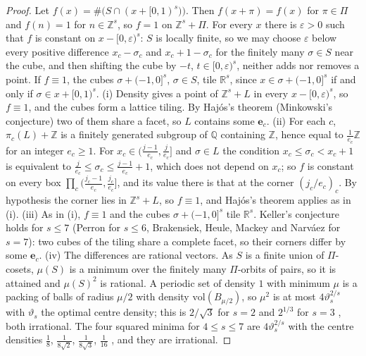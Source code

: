 \documentclass[11pt]{amsart}
\theoremstyle{definition}
\theoremstyle{plain}
\newcommand{\Z}{\mathbb{Z}}
\newcommand{\e}{\mathbf{e}}
\providecommand{\R}{\mathbb{R}}
\begin{document}
\begin{proof}
Let $f(x)=\#\bigl(S\cap(x+[0,1)^s)\bigr)$. Then $f(x+\pi)=f(x)$ for $\pi\in\Pi$ and $f(n)=1$ for $n\in\Z^s$, so $f=1$ on $\Z^s+\Pi$. For every $x$ there is $\varepsilon>0$ such that $f$ is constant on $x-[0,\varepsilon)^s$: $S$ is locally finite, so we may choose $\varepsilon$ below every positive difference $x_c-\sigma_c$ and $x_c+1-\sigma_c$ for the finitely many $\sigma\in S$ near the cube, and then shifting the cube by $-t$, $t\in[0,\varepsilon)^s$, neither adds nor removes a point. If $f\equiv1$, the cubes $\sigma+(-1,0]^s$, $\sigma\in S$, tile $\R^s$, since $x\in\sigma+(-1,0]^s$ if and only if $\sigma\in x+[0,1)^s$.
(i) Density gives a point of $\Z^s+L$ in every $x-[0,\varepsilon)^s$, so $f\equiv1$, and the cubes form a lattice tiling. By Haj\'os's theorem (Minkowski's conjecture) \cite{Haj42} two of them share a facet, so $L$ contains some $\e_c$.
(ii) For each $c$, $\pi_c(L)+\Z$ is a finitely generated subgroup of $\mathbb Q$ containing $\Z$, hence equal to $\frac1{e_c}\Z$ for an integer $e_c\ge1$. For $x_c\in(\frac{j-1}{e_c},\frac j{e_c}]$ and $\sigma\in L$ the condition $x_c\le\sigma_c<x_c+1$ is equivalent to $\frac j{e_c}\le\sigma_c\le\frac{j-1}{e_c}+1$, which does not depend on $x_c$; so $f$ is constant on every box $\prod_c(\frac{j_c-1}{e_c},\frac{j_c}{e_c}]$, and its value there is that at the corner $(j_c/e_c)_c$. By hypothesis the corner lies in $\Z^s+L$, so $f\equiv1$, and Haj\'os's theorem applies as in (i).
(iii) As in (i), $f\equiv1$ and the cubes $\sigma+(-1,0]^s$ tile $\R^s$. Keller's conjecture holds for $s\le7$ (Perron \cite{Per40} for $s\le6$, Brakensiek, Heule, Mackey and Narv\'aez \cite{BHMN20} for $s=7$): two cubes of the tiling share a complete facet, so their corners differ by some $\e_c$.
(iv) The differences are rational vectors. As $S$ is a finite union of $\Pi$-cosets, $\mu(S)$ is a minimum over the finitely many $\Pi$-orbits of pairs, so it is attained and $\mu(S)^2$ is rational. A periodic set of density $1$ with minimum $\mu$ is a packing of balls of radius $\mu/2$ with density $\mathrm{vol}(B_{\mu/2})$, so $\mu^2$ is at most $4\vartheta_s^{2/s}$ with $\vartheta_s$ the optimal centre density; this is $2/\sqrt3$ for $s=2$ \cite[Ch.~1]{CS99} and $2^{1/3}$ for $s=3$ \cite{Hal05}, both irrational. The four squared minima for $4\le s\le7$ are $4\vartheta_s^{2/s}$ with the centre densities $\frac18$, $\frac1{8\sqrt2}$, $\frac1{8\sqrt3}$, $\frac1{16}$ \cite{CS99}, and they are irrational.
\end{proof}
\end{document}
